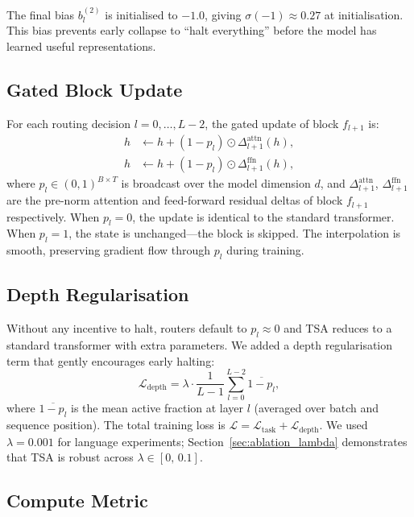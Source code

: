 \documentclass{article}
\newcommand{\tsa}{TSA\xspace}
\begin{document}
The final bias $b_l^{(2)}$ is initialised to $-1.0$, giving
$\sigma(-1) \approx 0.27$ at initialisation. This bias prevents early collapse to
``halt everything'' before the model has learned useful representations.

\subsection{Gated Block Update}

For each routing decision $l = 0, \ldots, L{-}2$, the gated update of block
$f_{l+1}$ is:
\begin{align}
  h &\leftarrow h + (1 - p_l) \odot \Delta_{l+1}^{\mathrm{attn}}(h), \\
  h &\leftarrow h + (1 - p_l) \odot \Delta_{l+1}^{\mathrm{ffn}}(h),
\end{align}
where $p_l \in (0,1)^{B \times T}$ is broadcast over the model dimension $d$, and
$\Delta_{l+1}^{\mathrm{attn}}$, $\Delta_{l+1}^{\mathrm{ffn}}$ are the pre-norm
attention and feed-forward residual deltas of block $f_{l+1}$ respectively. When $p_l = 0$, the update is identical
to the standard transformer. When $p_l = 1$, the state is unchanged---the block is
skipped. The interpolation is smooth, preserving gradient flow through $p_l$ during
training.

\subsection{Depth Regularisation}

Without any incentive to halt, routers default to $p_l \approx 0$ and \tsa reduces
to a standard transformer with extra parameters. We added a depth regularisation term
that gently encourages early halting:
\begin{equation}
  \mathcal{L}_\mathrm{depth} = \lambda \cdot \frac{1}{L-1}
  \sum_{l=0}^{L-2} \overline{1 - p_l},
\end{equation}
where $\overline{1-p_l}$ is the mean active fraction at layer $l$ (averaged over
batch and sequence position). The total training loss is
$\mathcal{L} = \mathcal{L}_\mathrm{task} + \mathcal{L}_\mathrm{depth}$. We used
$\lambda = 0.001$ for language experiments; Section~\ref{sec:ablation_lambda}
demonstrates that \tsa is robust across $\lambda \in [0,\, 0.1]$.

\subsection{Compute Metric}
\end{document}

